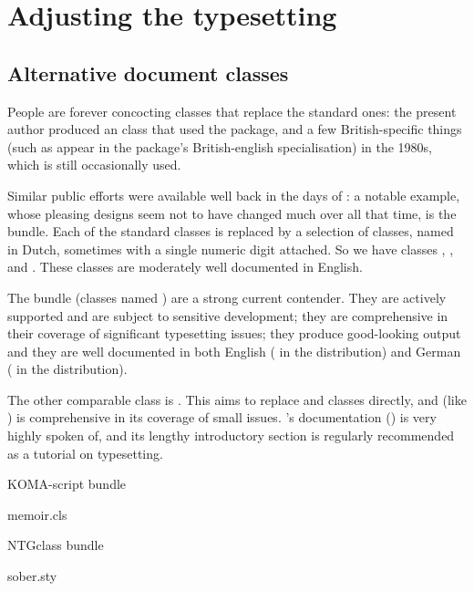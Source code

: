
\section{Adjusting the typesetting}

\subsection{Alternative document classes}


People are forever concocting classes that replace the standard ones:
the present author produced an  class that used the
 package, and a few British-specific things (such as
appear in the  package's British-english
specialisation) in the 1980s, which is still occasionally used.

Similar public efforts were available well back in the days of
\LaTeXo{}: a notable example, whose pleasing designs seem not to have
changed much over all that time, is the  bundle.
Each of the standard classes is replaced by a selection of classes,
named in Dutch, sometimes with a single numeric digit attached.  So we
have classes , ,  and
.  These classes are moderately well documented in
English.

The  bundle (classes named ) are a
strong current contender.  They are actively supported and are subject
to sensitive development; they are comprehensive in their coverage of
significant typesetting issues; they produce good-looking output and
they are well documented in both English ( in the
distribution) and German ( in the distribution).

The other comparable class is .  This aims to replace
 and  classes directly, and (like
) is comprehensive in its coverage of small issues.
's documentation () is very highly
spoken of, and its lengthy introductory section is regularly
recommended as a tutorial on typesetting.
\begin{ctanrefs}
\item[\nothtml{\rmfamily}KOMA-script bundle]
\item[memoir.cls]
\item[\nothtml{\rmfamily}NTGclass bundle]
\item[sober.sty]
\end{ctanrefs}

